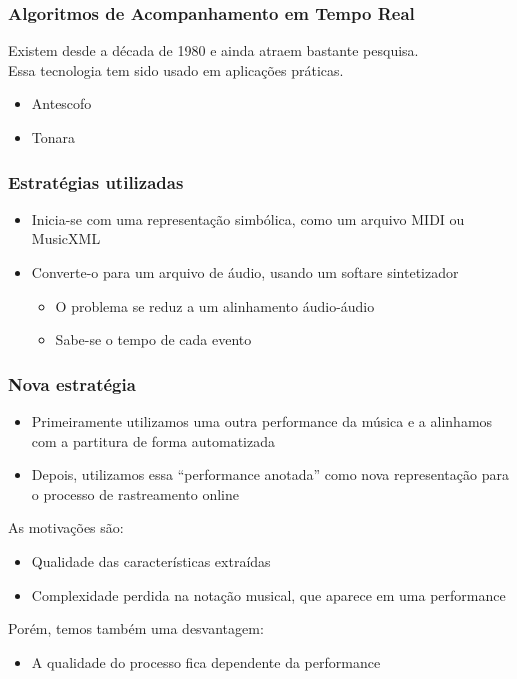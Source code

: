 \begin{frame}
  \frametitle{Algoritmos de Acompanhamento em Tempo Real}
  Existem desde a década de 1980 e ainda atraem bastante pesquisa.\pause\\
  Essa tecnologia tem sido usado em aplicações práticas.\pause
  \begin{itemize}
    \item Antescofo\\
    \item Tonara
  \end{itemize}
\end{frame}

\begin{frame}
  \frametitle{Estratégias utilizadas}
  \begin{itemize}
    \item Inicia-se com uma representação simbólica, como um arquivo MIDI ou MusicXML\\\pause
    \item Converte-o para um arquivo de áudio, usando um softare sintetizador\pause
      \begin{itemize}
        \item O problema se reduz a um alinhamento áudio-áudio\\\pause
        \item Sabe-se o tempo de cada evento\\
      \end{itemize}
  \end{itemize}
\end{frame}

\begin{frame}
  \frametitle{Nova estratégia}
  \begin{itemize}
    \item Primeiramente utilizamos uma outra performance da música e a alinhamos com a partitura de forma automatizada\\\pause
    \item Depois, utilizamos essa ``performance anotada'' como nova representação para o processo de rastreamento online\pause
  \end{itemize}

  As motivações são:\pause
  \begin{itemize}
    \item Qualidade das características extraídas\\\pause
    \item Complexidade perdida na notação musical, que aparece em uma performance\pause
  \end{itemize}
  Porém, temos também uma desvantagem:\pause
  \begin{itemize}
    \item A qualidade do processo fica dependente da performance\\
  \end{itemize}
\end{frame}

